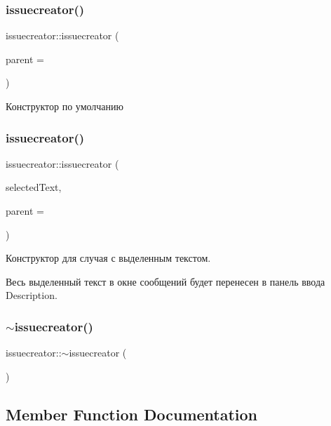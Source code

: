 \subsubsection{issuecreator()\hspace{0.1cm}{\footnotesize\ttfamily [1/2]}}
{\footnotesize\ttfamily issuecreator\+::issuecreator (\begin{DoxyParamCaption}\item[{Q\+Widget $\ast$}]{parent = {} }\end{DoxyParamCaption})\hspace{0.3cm}{\ttfamily [explicit]}}



Конструктор по умолчанию 

\mbox{\label{classissuecreator_ae623be0a0b031f1382b844133e51e1cb}} 
\subsubsection{issuecreator()\hspace{0.1cm}{\footnotesize\ttfamily [2/2]}}
{\footnotesize\ttfamily issuecreator\+::issuecreator (\begin{DoxyParamCaption}\item[{const Q\+String \&}]{selected\+Text,  }\item[{Q\+Widget $\ast$}]{parent = {} }\end{DoxyParamCaption})}



Конструктор для случая с выделенным текстом. 

Весь выделенный текст в окне сообщений будет перенесен в панель ввода Description. \mbox{\label{classissuecreator_ac3f6c719cc0c836d709f92a166f5ee30}} 
\subsubsection{$\sim$issuecreator()}
{\footnotesize\ttfamily issuecreator\+::$\sim$issuecreator (\begin{DoxyParamCaption}{ }\end{DoxyParamCaption})}



\subsection{Member Function Documentation}
\mbox{\label{classissuecreator_a332d178719de5c6905603d4715fe179f}} 
